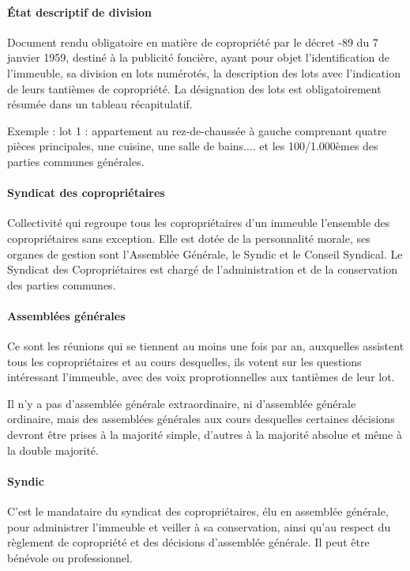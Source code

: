 	\paragraph*{État descriptif de division}
	Document rendu obligatoire en matière de copropriété par le décret -89 du 7 janvier 1959, destiné à la publicité foncière, ayant pour objet l'identification de l'immeuble, sa division en lots numérotés, la description des lots avec l'indication de leurs tantièmes de copropriété. La désignation des lots est obligatoirement résumée dans un tableau récapitulatif.
	
	Exemple : lot 1 : appartement au rez-de-chaussée à gauche comprenant quatre pièces principales, une cuisine, une salle de bains.... et les 100/1.000èmes des parties communes générales.
	
	\paragraph*{Syndicat des copropriétaires}
	Collectivité qui regroupe tous les copropriétaires d’un immeuble l'ensemble des copropriétaires sans exception. Elle est dotée de la personnalité morale, ses organes de gestion sont l’Assemblée Générale, le Syndic et le Conseil Syndical.
	Le Syndicat des Copropriétaires est chargé de l'administration et de la conservation des parties communes.
	
	\paragraph*{Assemblées générales}
	Ce sont les réunions qui se tiennent au moins une fois par an, auxquelles assistent tous les copropriétaires et au cours desquelles, ils votent sur les questions intéressant l'immeuble, avec des voix proprotionnelles aux tantièmes de leur lot.
	
	Il n'y a pas d'assemblée générale extraordinaire, ni d'assemblée générale ordinaire, mais des assemblées générales aux cours desquelles certaines décisions devront être prises à la majorité simple, d'autres à la majorité absolue et même à la double majorité.
	
	\paragraph*{Syndic} 
	C'est le mandataire du syndicat des copropriétaires, élu en assemblée générale, pour administrer l'immeuble et veiller à sa conservation, ainsi qu’au respect du règlement de copropriété et des décisions d’assemblée générale. Il peut être bénévole ou professionnel.
	
